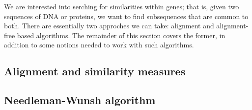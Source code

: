 \documentclass{subfiles}
\begin{document}
    We are interested into serching for similarities within genes;
        that is, given two sequences of DNA or proteins, we want to find subsequences 
        that are common to both. There are essentially two approches we can take:
        alignment and alignment-free based algorithms. The remainder of this section
        covers the former, in addition to some notions needed to work with such algorithms.

        \subsection{Alignment and similarity measures}
        

        \subsection{Needleman-Wunsh algorithm}
        
\end{document}
